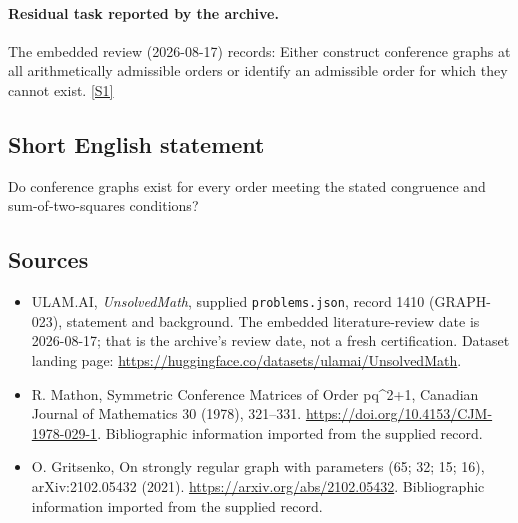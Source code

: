 \documentclass[11pt,a4paper]{article}
\newcommand{\sref}[2]{\hyperlink{source:#1:#2}{[S#2]}}
\begin{document}
\paragraph{Residual task reported by the archive.}

The embedded review (2026-08-17) records: Either construct conference graphs at all arithmetically admissible orders or identify an admissible order for which they cannot exist. \sref{1410}{1}

\subsection{Short English statement}

Do conference graphs exist for every order meeting the stated congruence and sum-of-two-squares conditions?

\subsection{Sources}

{\small

\begin{itemize}

\item[\hypertarget{source:1410:1}{S1}] ULAM.AI, \emph{UnsolvedMath}, supplied \texttt{problems.json}, record 1410 (GRAPH-023), statement and background. The embedded literature-review date is 2026-08-17; that is the archive’s review date, not a fresh certification. Dataset landing page: \url{https://huggingface.co/datasets/ulamai/UnsolvedMath}.

\item[\hypertarget{source:1410:2}{S2}] R. Mathon, Symmetric Conference Matrices of Order pq\textasciicircum{}2+1, Canadian Journal of Mathematics 30 (1978), 321–331. \url{https://doi.org/10.4153/CJM-1978-029-1}. Bibliographic information imported from the supplied record.

\item[\hypertarget{source:1410:3}{S3}] O. Gritsenko, On strongly regular graph with parameters (65; 32; 15; 16), arXiv:2102.05432 (2021). \url{https://arxiv.org/abs/2102.05432}. Bibliographic information imported from the supplied record.

\end{itemize}

}

\label{end:1410}
\end{document}
